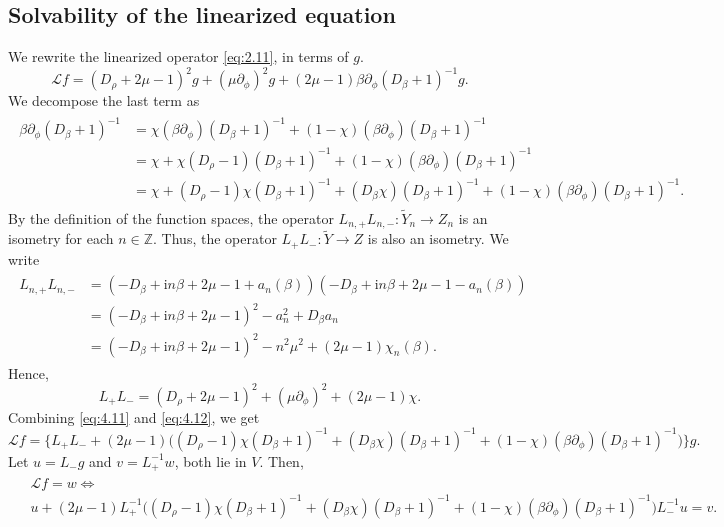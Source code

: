 \documentclass[11pt]{article}
\theoremstyle{definition}
\theoremstyle{remark}
\numberwithin{equation}{section}
\newcommand{\mbb}{\mathbb}
\newcommand{\mcal}{\mathcal}
\renewcommand{\tilde}{\widetilde}
\newcommand{\Z}{\mbb{Z}}
\newcommand{\del}{\partial}
\begin{document}
\subsection{Solvability of the linearized equation} \label{subsec:4.3}
We rewrite the linearized operator \eqref{eq:2.11}, in terms of $g$.
\[\mcal{L} f = (D_\rho + 2\mu - 1)^2 g + (\mu \del_\phi)^2 g + (2\mu - 1) \beta \del_\phi (D_\beta + 1)^{-1} g.\]
We decompose the last term as
\begin{align} \label{eq:4.11} \begin{split}
\beta \del_\phi (D_\beta + 1)^{-1} &= \chi (\beta \del_\phi) (D_\beta + 1)^{-1} + (1 - \chi) (\beta \del_\phi) (D_\beta + 1)^{-1} \\
&= \chi + \chi (D_\rho - 1)(D_\beta + 1)^{-1} + (1 - \chi) (\beta \del_\phi) (D_\beta + 1)^{-1} \\
&= \chi + (D_\rho - 1)\chi (D_\beta + 1)^{-1} + (D_\beta \chi) (D_\beta + 1)^{-1} + (1 - \chi) (\beta \del_\phi) (D_\beta + 1)^{-1}.
\end{split} \end{align}
By the definition of the function spaces, the operator $L_{n,+} L_{n,-}: \tilde{Y}_n \to Z_n$ is an isometry for each $n \in \Z$. Thus, the operator $L_+ L_-: \tilde{Y} \to Z$ is also an isometry. We write
\begin{align*} \begin{split}
L_{n,+} L_{n,-} &= (-D_\beta + \textrm{i}n\beta + 2\mu - 1 + a_n(\beta)) (-D_\beta + \textrm{i}n\beta + 2\mu - 1 - a_n(\beta)) \\
&= (-D_\beta + \textrm{i}n\beta + 2\mu - 1)^2 - a_n^2 + D_\beta a_n \\
&= (-D_\beta + \textrm{i}n\beta + 2\mu - 1)^2 - n^2 \mu^2 + (2\mu - 1) \chi_n (\beta).
\end{split} \end{align*}
Hence,
\begin{equation} \label{eq:4.12}
	L_+ L_- = (D_\rho + 2\mu - 1)^2 + (\mu \del_\phi)^2 + (2\mu - 1) \chi.
\end{equation}
Combining \eqref{eq:4.11} and \eqref{eq:4.12}, we get
\[\mcal{L} f = \Big\{ L_+ L_- + (2\mu - 1) \Big( (D_\rho - 1)\chi (D_\beta + 1)^{-1} + (D_\beta \chi) (D_\beta + 1)^{-1} + (1 - \chi) (\beta \del_\phi) (D_\beta + 1)^{-1} \Big) \Big\} g.\]
Let $u = L_- g$ and $v = L_+^{-1} w$, both lie in $V$. Then,
\begin{align*} \begin{split}
&\mcal{L} f = w \iff \\
&u + (2\mu - 1) L_+^{-1} \Big( (D_\rho - 1) \chi (D_\beta + 1)^{-1} + (D_\beta \chi) (D_\beta + 1)^{-1} + (1-\chi) (\beta \del_\phi) (D_\beta + 1)^{-1} \Big) L_-^{-1} u = v.
\end{split} \end{align*}
\end{document}
